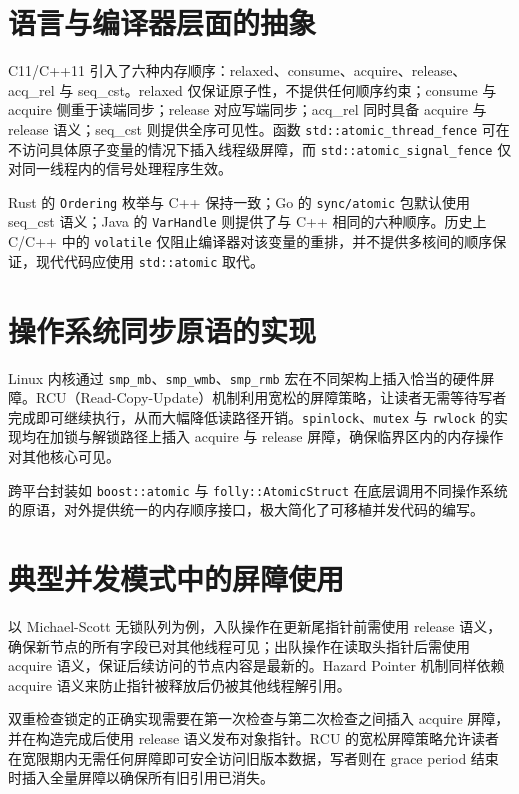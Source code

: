 \chapter{语言与编译器层面的抽象}
C11/C++11 引入了六种内存顺序：relaxed、consume、acquire、release、acq\_{}rel 与 seq\_{}cst。relaxed 仅保证原子性，不提供任何顺序约束；consume 与 acquire 侧重于读端同步；release 对应写端同步；acq\_{}rel 同时具备 acquire 与 release 语义；seq\_{}cst 则提供全序可见性。函数 \texttt{std::atomic\_{}thread\_{}fence} 可在不访问具体原子变量的情况下插入线程级屏障，而 \texttt{std::atomic\_{}signal\_{}fence} 仅对同一线程内的信号处理程序生效。\par
Rust 的 \texttt{Ordering} 枚举与 C++ 保持一致；Go 的 \texttt{sync/atomic} 包默认使用 seq\_{}cst 语义；Java 的 \texttt{VarHandle} 则提供了与 C++ 相同的六种顺序。历史上 C/C++ 中的 \texttt{volatile} 仅阻止编译器对该变量的重排，并不提供多核间的顺序保证，现代代码应使用 \texttt{std::atomic} 取代。\par
\chapter{操作系统同步原语的实现}
Linux 内核通过 \texttt{smp\_{}mb}、\texttt{smp\_{}wmb}、\texttt{smp\_{}rmb} 宏在不同架构上插入恰当的硬件屏障。RCU（Read-Copy-Update）机制利用宽松的屏障策略，让读者无需等待写者完成即可继续执行，从而大幅降低读路径开销。\texttt{spinlock}、\texttt{mutex} 与 \texttt{rwlock} 的实现均在加锁与解锁路径上插入 acquire 与 release 屏障，确保临界区内的内存操作对其他核心可见。\par
跨平台封装如 \texttt{boost::atomic} 与 \texttt{folly::AtomicStruct} 在底层调用不同操作系统的原语，对外提供统一的内存顺序接口，极大简化了可移植并发代码的编写。\par
\chapter{典型并发模式中的屏障使用}
以 Michael-Scott 无锁队列为例，入队操作在更新尾指针前需使用 release 语义，确保新节点的所有字段已对其他线程可见；出队操作在读取头指针后需使用 acquire 语义，保证后续访问的节点内容是最新的。Hazard Pointer 机制同样依赖 acquire 语义来防止指针被释放后仍被其他线程解引用。\par
双重检查锁定的正确实现需要在第一次检查与第二次检查之间插入 acquire 屏障，并在构造完成后使用 release 语义发布对象指针。RCU 的宽松屏障策略允许读者在宽限期内无需任何屏障即可安全访问旧版本数据，写者则在 grace period 结束时插入全量屏障以确保所有旧引用已消失。\par
